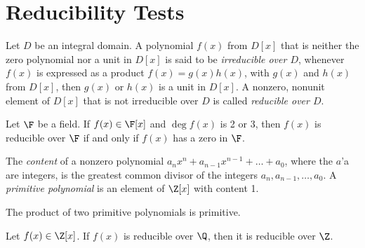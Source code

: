 \section{Reducibility Tests}

\begin{definition}
	Let $D$ be an integral domain. A polynomial $f(x)$ from $D[x]$ that is neither the zero polynomial nor a unit in $D[x]$ is said to be \textit{irreducible over $D$}, whenever $f(x)$ is expressed as a product $f(x) = g(x)h(x)$, with $g(x)$ and $h(x)$ from $D[x]$, then $g(x)$ or $h(x)$ is a unit in $D[x]$. A nonzero, nonunit element of $D[x]$ that is not irreducible over $D$ is called \textit{reducible over $D$}.
\end{definition}

\begin{theorem}
	Let $\F$ be a field. If $f(x) \in \F[x]$ and $\deg f(x)$ is 2 or 3, then $f(x)$ is reducible over $\F$ if and only if $f(x)$ has a zero in $\F$.
\end{theorem}

\begin{definition}
	The \textit{content} of a nonzero polynomial $a_nx^n + a_{n-1}x^{n-1} + \dots + a_0$, where the $a$'a are integers, is the greatest common divisor of the integers $a_n,a_{n-1}, \dots, a_0$. A \textit{primitive polynomial} is an element of $\Z[x]$ with content 1.
\end{definition}

\begin{lemma}
	The product of two primitive polynomials is primitive.
\end{lemma}

\begin{theorem}
	Let $f(x) \in \Z[x]$. If $f(x)$ is reducible over $\Q$, then it is reducible over $\Z$.
\end{theorem}
